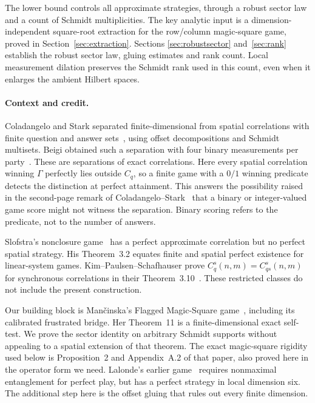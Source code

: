 \documentclass[11pt]{article}
\theoremstyle{definition}
\begin{document}
The lower bound controls all approximate strategies, through a robust
sector law and a count of Schmidt multiplicities. The key analytic input
is a dimension-independent square-root extraction for the row/column
magic-square game, proved in Section~\ref{sec:extraction}. Sections
\ref{sec:robustsector} and~\ref{sec:rank} establish the robust sector law,
gluing estimates and rank count. Local measurement dilation preserves
the Schmidt rank used in this count, even when it enlarges the ambient
Hilbert spaces.

\paragraph{Context and credit.}
Coladangelo and Stark separated finite-dimensional from spatial correlations with finite question and answer sets~\cite{CS18}, using offset decompositions and Schmidt multisets. Beigi obtained such a separation with four binary measurements per party~\cite{Beigi}. These are separations of exact correlations. Here every spatial correlation winning $\Gamma$ perfectly lies outside $C_q$, so a finite game with a $0/1$ winning predicate detects the distinction at perfect attainment. This answers the possibility raised in the second-page remark of Coladangelo--Stark~\cite{CS17} that a binary or integer-valued game score might not witness the separation. Binary scoring refers to the predicate, not to the number of answers.

Slofstra's nonclosure game~\cite{Slofstra} has a perfect approximate correlation but no perfect spatial strategy. His Theorem~3.2 equates finite and spatial perfect existence for linear-system games. Kim--Paulsen--Schafhauser prove $C_q^s(n,m)=C_{qs}^s(n,m)$ for synchronous correlations in their Theorem~3.10~\cite{KPS}. These restricted classes do not include the present construction.

Our building block is Man\v{c}inska's Flagged Magic-Square game~\cite{Mancinska}, including its calibrated frustrated bridge. Her Theorem~11 is a finite-dimensional exact self-test. We prove the sector identity on arbitrary Schmidt supports without appealing to a spatial extension of that theorem. The exact magic-square rigidity used below is Proposition~2 and Appendix~A.2 of that paper, also proved here in the operator form we need. Lalonde's earlier game~\cite{Lalonde} requires nonmaximal entanglement for perfect play, but has a perfect strategy in local dimension six. The additional step here is the offset gluing that rules out every finite dimension.
\end{document}
